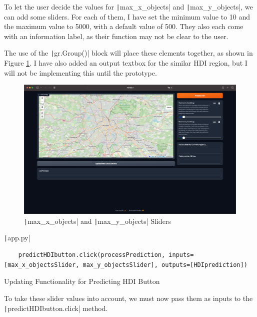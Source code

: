 \documentclass[12pt]{report}
\newcommand{\pil}[1]{\protect\texttt|#1|}
\begin{document}
To let the user decide the values for \pil{max_x_objects} and \pil{max_y_objects}, we can add some sliders. For each of them, I have set the minimum value to 10 and the maximum value to 5000, with a default value of 500. They also each come with an information label, as their function may not be clear to the user.

The use of the \pil{gr.Group()} block will place these elements together, as shown in Figure \ref{fig:ss12.6}. I have also added an output textbox for the similar HDI region, but I will not be implementing this until the  prototype.

\begin{figure}[H]
\centering
\includegraphics[width=14cm]{ss12.6.png}
\caption{\pil{max_x_objects} and \pil{max_y_objects} Sliders}\label{fig:ss12.6}
\end{figure}

\begin{listing}[H]
\pil{app.py}
\begin{verbatim}
    predictHDIbutton.click(processPrediction, inputs=[max_x_objectsSlider, max_y_objectsSlider], outputs=[HDIprediction])
\end{verbatim}
\caption{Updating Functionality for Predicting HDI Button}\label{cs:addNewInputsToButton}
\end{listing}

To take these slider values into account, we must now pass them as inputs to the \pil{predictHDIbutton.click} method.
\end{document}
